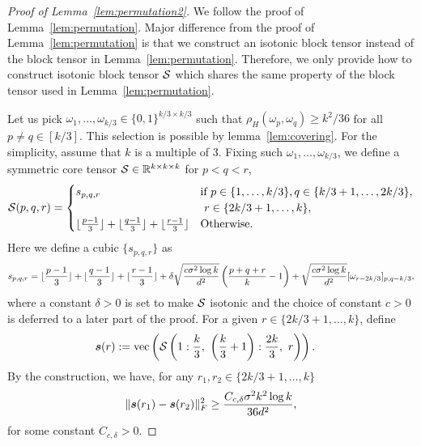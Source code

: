 \documentclass[12pt]{article}
\theoremstyle{definition}
\begin{document}
 \begin{proof}[Proof of Lemma~\ref{lem:permutation2}]
We follow the proof of Lemma~\ref{lem:permutation}.
Major difference from the proof of Lemma~\ref{lem:permutation} is that  we construct an isotonic block tensor instead of the block tensor in  Lemma~\ref{lem:permutation}. 
Therefore, we only provide how to construct isotonic block tensor $\mathcal{S}$ which shares the same property of the block tensor used in Lemma~\ref{lem:permutation}.

Let us pick $\omega_1,\ldots,\omega_{k/3}\in\{0,1\}^{k/3\times k/3}$ such that $\rho_H(\omega_p,\omega_q)\geq k^2/36$ for all $p\neq q\in [k/3]$. This selection is possible by lemma~\ref{lem:covering}. For the simplicity, assume that $k$ is a multiple of 3.
Fixing such $\omega_1,\ldots,\omega_{k/3}$, we define a symmetric core tensor $\mathcal{S}\in\mathbb{R}^{k\times k\times k}$ for $p<q<r$,
\begin{align}
    \mathcal{S}(p,q,r) = \begin{cases}s_{p,q,r} &\text{if }p\in\{1,\ldots,k/3\},q\in\{k/3+1,\ldots,2k/3\}, \\
    &\ r\in\{2k/3+1,\ldots,k\},\\ 
    \lfloor \frac{p-1}{3} \rfloor+\lfloor \frac{q-1}{3} \rfloor+\lfloor \frac{r-1}{3} \rfloor&\text{Otherwise.}
    \end{cases}
\end{align}
Here we define a cubic $\{s_{p,q,r}\}$ as 
\begin{align}
    s_{p,q,r} = \lfloor \frac{p-1}{3} \rfloor+\lfloor \frac{q-1}{3} \rfloor+\lfloor \frac{r-1}{3} \rfloor + \delta\sqrt{c\sigma^2\log k\over d^{2}}\left({p+q+r\over k}-1\right)+  \sqrt{c\sigma^2\log k\over d^{2}}[\omega_{r-2k/3}]_{p,q-k/3},
\end{align} 
where a constant $\delta>0$ is set to make $\mathcal{S}$ isotonic and the choice of constant $c>0$ is deferred to a later part of the proof. For a given $r\in\{2k/3+1,\ldots, k\}$, define
\begin{align}\label{eq:structure2}
    \ms(r)&:= \text{vec}\left(\tS\left(1:\frac{k}{3},\ \left(\frac{k}{3}+1\right):\frac{2k}{3},\ r\right)\right).
\end{align}
By the construction, we have, for any $r_1,r_2\in\{2k/3+1,\ldots,k\}$
\begin{align}\label{eq:sr2}
    \lVert\bm{s}(r_1)-\bm{s}(r_2)\rVert_F^2\geq \frac{C_{c,\delta}\sigma^2k^2\log k}{36d^2},
\end{align}
for some constant $C_{c,\delta}>0$.


\end{proof}
\end{document}
